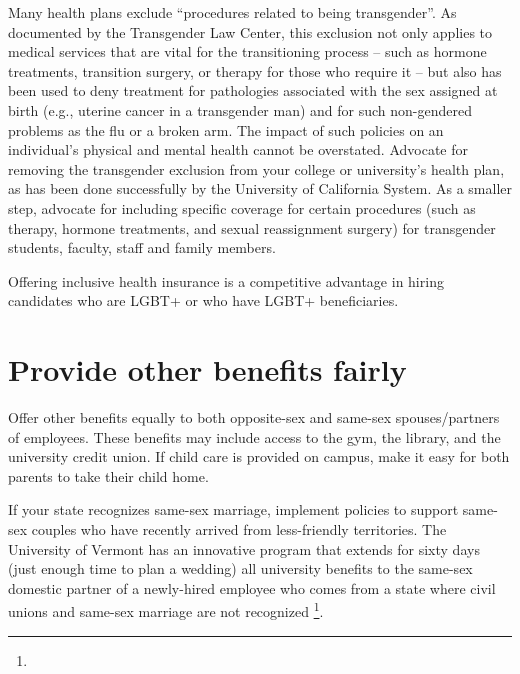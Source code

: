 Many health plans exclude ``procedures related to being transgender''. As documented by the Transgender Law Center, this exclusion not only applies to medical services that are vital for the transitioning process -- such as hormone treatments, transition surgery, or therapy for those who require it -- but also has been used to deny treatment for pathologies associated with the sex assigned at birth (e.g., uterine cancer in a transgender man) and for such non-gendered problems as the flu or a broken arm. The impact of such policies on an individual's physical and mental health cannot be overstated. Advocate for removing the transgender exclusion from your college or university's health plan, as has been done successfully by the University of California System.  As a smaller step, advocate for including specific coverage for certain procedures (such as therapy, hormone treatments, and sexual reassignment surgery) for transgender students, faculty, staff and family members.

Offering inclusive health insurance is a competitive advantage in hiring candidates who are LGBT+ or who have LGBT+ beneficiaries.



\section {Provide other benefits fairly}
\label{other-benefits}
Offer other benefits equally to both opposite-sex and same-sex spouses/partners of employees.  These benefits may include access to the gym, the library, and the university credit union.  If child care is provided on campus, make it easy for both parents to take their child home.  

If your state recognizes same-sex marriage, implement policies to support same-sex couples who have recently arrived from less-friendly territories.  The University of Vermont has an innovative program that extends for sixty days (just enough time to plan a wedding) all university benefits to the same-sex domestic partner of a newly-hired employee who comes from a state where civil unions and same-sex marriage are not recognized \footnote{}.  

